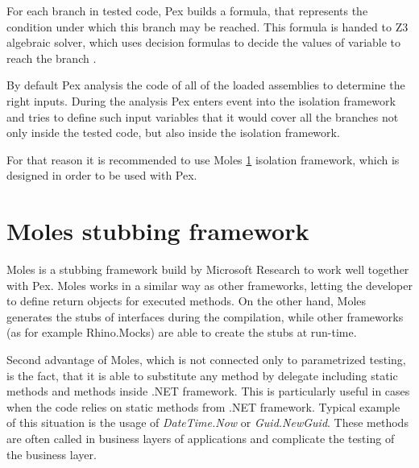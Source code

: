 For each branch in tested code, Pex builds  a formula, that represents the condition under which this branch may be reached. This formula is handed to Z3 algebraic solver, which uses decision formulas to decide the values of variable to reach the branch \cite{Tillman08}.

By default Pex analysis the code of all of the loaded assemblies to determine the right inputs. During the analysis Pex enters event into the isolation framework and tries to define such input variables that it would cover all the branches not only inside the tested code, but also inside the isolation framework.

For that reason it is recommended to use Moles \ref{tech:moles} isolation framework, which is designed in order to be used with Pex.

\section{Moles stubbing framework}
\label{tech:moles}
Moles is a stubbing framework build by Microsoft Research to work well together with Pex. Moles works in a similar way as other frameworks, letting the developer to define return objects for executed methods. On the other hand, Moles generates the stubs of interfaces during the compilation, while other frameworks (as for example Rhino.Mocks) are able to create the stubs at run-time.

Second advantage of Moles, which is not connected only to parametrized testing, is the fact, that it is able to substitute any method by delegate including static methods and methods inside .NET framework. This is particularly useful in cases when the code relies on static methods from .NET framework. Typical example of this situation is the usage of \textit{DateTime.Now} or \textit{Guid.NewGuid}. These methods are often called in business layers of applications and complicate the testing of the business layer.

